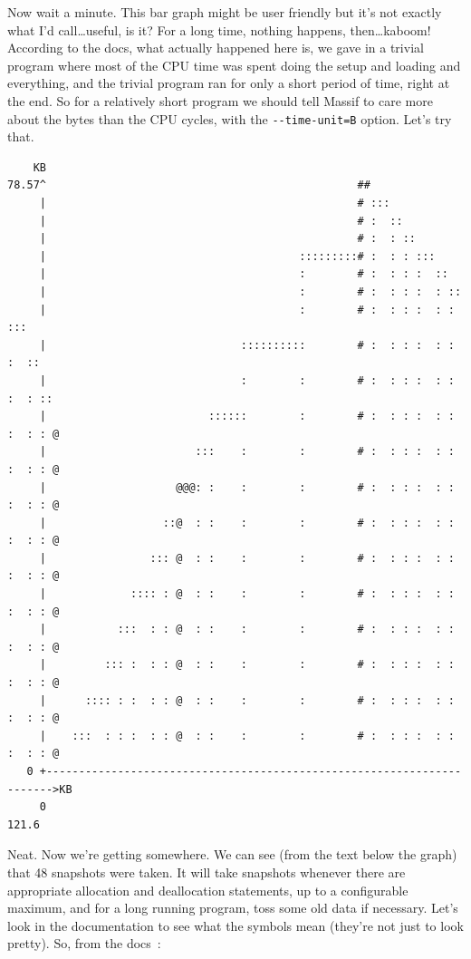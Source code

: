 Now wait a minute. This bar graph might be user friendly but it's not exactly what I'd call\ldots useful, is it? For a long time, nothing happens, then\ldots kaboom! According to the docs, what actually happened here is, we gave in a trivial program where most of the CPU time was spent doing the setup and loading and everything, and the trivial program ran for only a short period of time, right at the end. So for a relatively short program we should tell Massif to care more about the bytes than the CPU cycles, with the \verb+--time-unit=B+ option. Let's try that.

{\scriptsize
\begin{verbatim}
    KB
78.57^                                                ##                      
     |                                                # :::                   
     |                                                # :  ::                 
     |                                                # :  : ::               
     |                                       :::::::::# :  : : :::            
     |                                       :        # :  : : :  ::          
     |                                       :        # :  : : :  : ::        
     |                                       :        # :  : : :  : : :::     
     |                              ::::::::::        # :  : : :  : : :  ::   
     |                              :        :        # :  : : :  : : :  : :: 
     |                         ::::::        :        # :  : : :  : : :  : : @
     |                       :::    :        :        # :  : : :  : : :  : : @
     |                    @@@: :    :        :        # :  : : :  : : :  : : @
     |                  ::@  : :    :        :        # :  : : :  : : :  : : @
     |                ::: @  : :    :        :        # :  : : :  : : :  : : @
     |             :::: : @  : :    :        :        # :  : : :  : : :  : : @
     |           :::  : : @  : :    :        :        # :  : : :  : : :  : : @
     |         ::: :  : : @  : :    :        :        # :  : : :  : : :  : : @
     |      :::: : :  : : @  : :    :        :        # :  : : :  : : :  : : @
     |    :::  : : :  : : @  : :    :        :        # :  : : :  : : :  : : @
   0 +----------------------------------------------------------------------->KB
     0                                                                   121.6
\end{verbatim}
}

Neat. Now we're getting somewhere. We can see (from the text below the graph) that 48 snapshots were taken. It will take snapshots whenever there are appropriate allocation and deallocation statements, up to a configurable maximum, and for a long running program, toss some old data if necessary. Let's look in the documentation to see what the symbols mean (they're not just to look pretty). So, from the docs~\cite{massif}:


